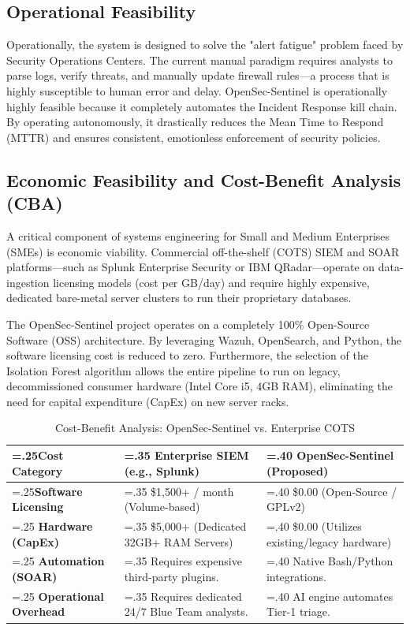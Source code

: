 \documentclass[12pt, a4paper]{report}
\begin{document}
	\subsection{Operational Feasibility}
	Operationally, the system is designed to solve the "alert fatigue" problem faced by Security Operations Centers. The current manual paradigm requires analysts to parse logs, verify threats, and manually update firewall rules—a process that is highly susceptible to human error and delay. OpenSec-Sentinel is operationally highly feasible because it completely automates the Incident Response kill chain. By operating autonomously, it drastically reduces the Mean Time to Respond (MTTR) and ensures consistent, emotionless enforcement of security policies.
	
	\subsection{Economic Feasibility and Cost-Benefit Analysis (CB\-A)}
	A critical component of systems engineering for Small and Medium Enterprises (SMEs) is economic viability. Commercial off-the-shelf (COTS) SIEM and SOAR platforms—such as Splunk Enterprise Security or IBM QRadar—operate on data-ingestion licensing models (cost per GB/day) and require highly expensive, dedicated bare-metal server clusters to run their proprietary databases.
	
	The OpenSec-Sentinel project operates on a completely 100\% Open-Source Software (OSS) architecture. By leveraging Wazuh, OpenSearch, and Python, the software licensing cost is reduced to zero. Furthermore, the selection of the Isolation Forest algorithm allows the entire pipeline to run on legacy, decommissioned consumer hardware (Intel Core i5, 4GB RAM), eliminating the need for capital expenditure (CapEx) on new server racks.
	
	\begin{table}[H]
		\centering
		\caption{Cost-Benefit Analysis: OpenSec-Sentinel vs. Enterprise COTS}
		\vspace{0.2cm}
		\begin{tabularx}{\textwidth}{|>{\hsize=.25\hsize}X|>{\hsize=.35\hsize}X|>{\hsize=.40\hsize}X|}
			\hline
			\textbf{Cost Category} & \textbf{Enterprise SIEM (e.g., Splunk)} & \textbf{OpenSec-Sentinel (Proposed)} \\
			\hline
			\textbf{Software Licensing} & \$1,500+ / month (Volume-based) & \$0.00 (Open-Source / GPLv2) \\
			\hline
			\textbf{Hardware (CapEx)} & \$5,000+ (Dedicated 32GB+ RAM Servers) & \$0.00 (Utilizes existing/legacy hardware) \\
			\hline
			\textbf{Automation (SOAR)} & Requires expensive third-party plugins. & Native Bash/Python integrations. \\
			\hline
			\textbf{Operational Overhead} & Requires dedicated 24/7 Blue Team analysts. & AI engine automates Tier-1 triage. \\
			\hline
		\end{tabularx}
	\end{table}
	
\end{document}
